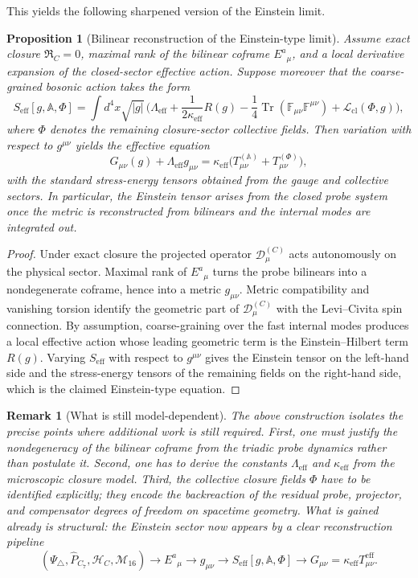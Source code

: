 \documentclass[12pt,a4paper]{article}
\newtheorem{proposition}[theorem]{Proposition}
\newtheorem*{remark}{Remark}
\begin{document}
This yields the following sharpened version of the Einstein limit.

\begin{proposition}[Bilinear reconstruction of the Einstein-type limit]
Assume exact closure $\mathfrak R_C=0$, maximal rank of the bilinear coframe
$E^a{}_{\mu}$, and a local derivative expansion of the closed-sector effective
action. Suppose moreover that the coarse-grained bosonic action takes the form
\[
  S_{\mathrm{eff}}[g,\mathbb A,\Phi]
  = \int d^4x\sqrt{|g|}\,\bigl(
      \Lambda_{\mathrm{eff}}
      + \frac{1}{2\kappa_{\mathrm{eff}}}R(g)
      - \frac14\operatorname{Tr}(\mathbb F_{\mu\nu}\mathbb F^{\mu\nu})
      + \mathcal L_{\mathrm{cl}}(\Phi,g)
    \bigr),
\]
where $\Phi$ denotes the remaining closure-sector collective fields.
Then variation with respect to $g^{\mu\nu}$ yields the effective equation
\[
  G_{\mu\nu}(g) + \Lambda_{\mathrm{eff}}g_{\mu\nu}
  = \kappa_{\mathrm{eff}}
    \bigl(T^{(\mathbb A)}_{\mu\nu} + T^{(\Phi)}_{\mu\nu}\bigr),
\]
with the standard stress-energy tensors obtained from the gauge and collective
sectors. In particular, the Einstein tensor arises from the closed probe
system once the metric is reconstructed from bilinears and the internal modes
are integrated out.
\end{proposition}

\begin{proof}
Under exact closure the projected operator $\mathcal D^{(C)}_\mu$ acts
autonomously on the physical sector. Maximal rank of $E^a{}_{\mu}$ turns the
probe bilinears into a nondegenerate coframe, hence into a metric
$g_{\mu\nu}$. Metric compatibility and vanishing torsion identify the geometric
part of $\mathcal D^{(C)}_\mu$ with the Levi--Civita spin connection.
By assumption, coarse-graining over the fast internal modes produces a local
effective action whose leading geometric term is the Einstein--Hilbert term
$R(g)$. Varying $S_{\mathrm{eff}}$ with respect to $g^{\mu\nu}$ gives the Einstein
tensor on the left-hand side and the stress-energy tensors of the remaining
fields on the right-hand side, which is the claimed Einstein-type equation.
\end{proof}

\begin{remark}[What is still model-dependent]
The above construction isolates the precise points where additional work is
still required.
First, one must justify the nondegeneracy of the bilinear coframe from the
triadic probe dynamics rather than postulate it.
Second, one has to derive the constants $\Lambda_{\mathrm{eff}}$ and
$\kappa_{\mathrm{eff}}$ from the microscopic closure model.
Third, the collective closure fields $\Phi$ have to be identified explicitly;
they encode the backreaction of the residual probe, projector, and compensator
degrees of freedom on spacetime geometry.
What is gained already is structural: the Einstein sector now appears by a
clear reconstruction pipeline
\[
  (\Psi_\triangle,\hat P_{C_7},\mathcal H_C,\mathcal M_{16})
  \longrightarrow E^a{}_{\mu}
  \longrightarrow g_{\mu\nu}
  \longrightarrow S_{\mathrm{eff}}[g,\mathbb A,\Phi]
  \longrightarrow G_{\mu\nu}=\kappa_{\mathrm{eff}}T_{\mu\nu}^{\mathrm{eff}}.
\]
\end{remark}
\end{document}
